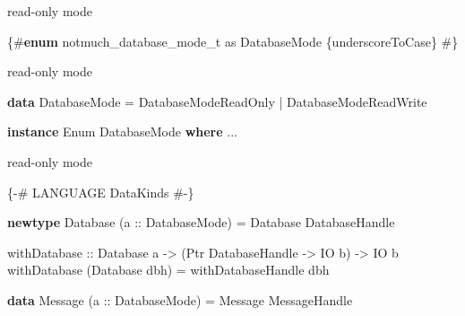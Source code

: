 \documentclass[ignorenonframetext,aspectratio=169]{beamer}
\newenvironment{Shaded}{}{}
\newcommand{\KeywordTok}[1]{\textcolor[rgb]{0.00,0.44,0.13}{\textbf{{#1}}}}
\newcommand{\DataTypeTok}[1]{\textcolor[rgb]{0.56,0.13,0.00}{{#1}}}
\newcommand{\StringTok}[1]{\textcolor[rgb]{0.25,0.44,0.63}{{#1}}}
\newcommand{\OtherTok}[1]{\textcolor[rgb]{0.00,0.44,0.13}{{#1}}}
\newcommand{\FunctionTok}[1]{\textcolor[rgb]{0.02,0.16,0.49}{{#1}}}
\newcommand{\NormalTok}[1]{{#1}}
\begin{document}
\begin{frame}[fragile]{read-only mode}

\begin{Shaded}
\begin{Highlighting}[]
\StringTok{\{#}\KeywordTok{enum} \StringTok{notmuch_database_mode_t} as \DataTypeTok{DatabaseMode} \StringTok{\{underscoreToCase\} #\}}
\end{Highlighting}
\end{Shaded}

\end{frame}

\begin{frame}[fragile]{read-only mode}

\begin{Shaded}
\begin{Highlighting}[]
\KeywordTok{data} \DataTypeTok{DatabaseMode} \FunctionTok{=} \DataTypeTok{DatabaseModeReadOnly}
                  \FunctionTok{|} \DataTypeTok{DatabaseModeReadWrite}

\KeywordTok{instance} \DataTypeTok{Enum} \DataTypeTok{DatabaseMode} \KeywordTok{where}
  \FunctionTok{...}
\end{Highlighting}
\end{Shaded}

\end{frame}

\begin{frame}[fragile]{read-only mode}

\begin{Shaded}
\begin{Highlighting}[]
\OtherTok{\{-# LANGUAGE DataKinds #-\}}

\KeywordTok{newtype} \DataTypeTok{Database} \NormalTok{(}\OtherTok{a ::} \DataTypeTok{DatabaseMode}\NormalTok{) }\FunctionTok{=} \DataTypeTok{Database} \DataTypeTok{DatabaseHandle}

\OtherTok{withDatabase ::} \DataTypeTok{Database} \NormalTok{a }\OtherTok{->} \NormalTok{(}\DataTypeTok{Ptr} \DataTypeTok{DatabaseHandle} \OtherTok{->} \DataTypeTok{IO} \NormalTok{b) }\OtherTok{->} \DataTypeTok{IO} \NormalTok{b}
\NormalTok{withDatabase (}\DataTypeTok{Database} \NormalTok{dbh) }\FunctionTok{=} \NormalTok{withDatabaseHandle dbh}

\KeywordTok{data} \DataTypeTok{Message} \NormalTok{(}\OtherTok{a ::} \DataTypeTok{DatabaseMode}\NormalTok{) }\FunctionTok{=} \DataTypeTok{Message} \DataTypeTok{MessageHandle}
\end{Highlighting}
\end{Shaded}

\end{frame}
\end{document}
